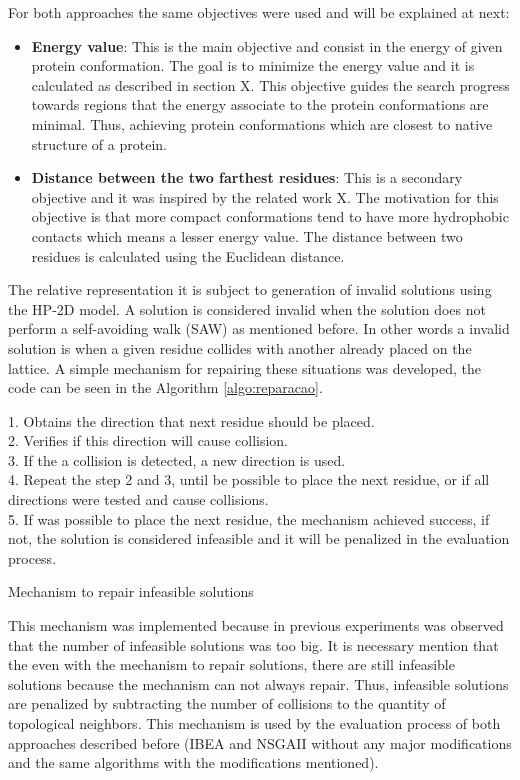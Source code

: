 For both approaches the same objectives were used and will be explained  at next:

\begin{itemize}
	\item \textbf{Energy value}: This is the main objective and consist in the energy of given protein conformation.  The goal is to minimize the energy value and it is calculated as described in section X. This objective guides the search progress towards regions that the energy associate to the protein conformations are minimal. Thus, achieving protein conformations which are closest to native structure of a protein.
	\item \textbf{Distance between the two farthest residues}: This is a secondary objective and it was inspired by the related work X. The motivation for this objective is that more compact conformations tend to have more hydrophobic contacts which means a lesser energy value. The distance between two residues is calculated using the Euclidean distance.
\end{itemize}




The relative representation it is subject to generation of invalid solutions using the HP-2D model. A solution is considered invalid when the solution does not perform a self-avoiding walk (SAW) as mentioned before. In other words a invalid solution is when a given residue collides with another already placed on the lattice. A simple mechanism for repairing these situations was developed, the code can be seen in the Algorithm \ref{algo:reparacao}.

\begin{algorithm}[h]
	1. Obtains the direction that next residue should be placed.\\
	2. Verifies if this direction will cause collision.\\
	3. If the a collision is detected, a new direction is used.\\
	4. Repeat the step 2 and 3, until be possible to place the next residue, or if all directions were tested and cause collisions.\\
	5. If was possible to place the next residue, the mechanism achieved success, if not, the solution is considered infeasible and it will be penalized in the evaluation process.
	\caption{Mechanism to repair infeasible solutions}
	\label{algo:reparacao}
\end{algorithm}

This mechanism was implemented because in previous experiments was observed that the number of infeasible solutions was too big. It is necessary mention that the even with the mechanism to repair solutions, there are still infeasible solutions because the mechanism can not always repair. Thus, infeasible solutions are penalized by subtracting the number of collisions to the quantity of topological neighbors. This mechanism is used by the evaluation process of both approaches described before (IBEA and NSGAII without any major modifications and the same algorithms with the modifications mentioned).

